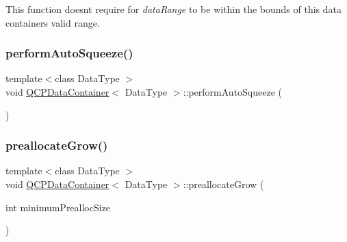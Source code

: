 This function doesn\textquotesingle{}t require for {\itshape data\+Range} to be within the bounds of this data container\textquotesingle{}s valid range. \mbox{\label{class_q_c_p_data_container_a83c25ac14be1c920df85e797ee75c982}} 
\subsubsection{\texorpdfstring{perform\+Auto\+Squeeze()}{performAutoSqueeze()}}
{\footnotesize\ttfamily template$<$class Data\+Type $>$ \\
void \hyperlink{class_q_c_p_data_container}{Q\+C\+P\+Data\+Container}$<$ Data\+Type $>$\+::perform\+Auto\+Squeeze (\begin{DoxyParamCaption}{ }\end{DoxyParamCaption})\hspace{0.3cm}{\ttfamily [protected]}}

\mbox{\label{class_q_c_p_data_container_aae8cdb2bcc3b900ec22f26df3e7d67c7}} 
\subsubsection{\texorpdfstring{preallocate\+Grow()}{preallocateGrow()}}
{\footnotesize\ttfamily template$<$class Data\+Type $>$ \\
void \hyperlink{class_q_c_p_data_container}{Q\+C\+P\+Data\+Container}$<$ Data\+Type $>$\+::preallocate\+Grow (\begin{DoxyParamCaption}\item[{int}]{minimum\+Prealloc\+Size }\end{DoxyParamCaption})\hspace{0.3cm}{\ttfamily [protected]}}

\mbox{\label{class_q_c_p_data_container_ae5f569a120648b167efa78835f12fd38}} 
